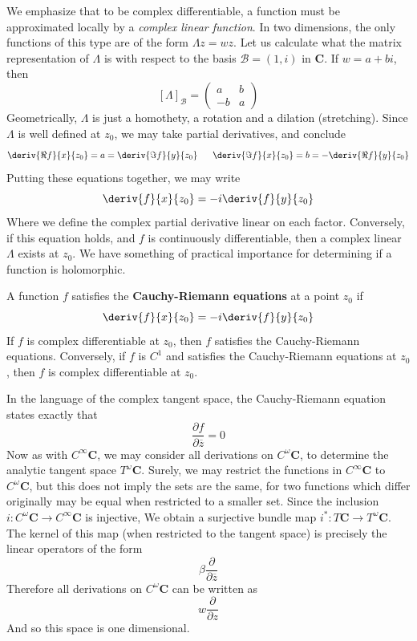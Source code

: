 We emphasize that to be complex differentiable, a function must be approximated locally by a {\it complex linear function}. In two dimensions, the only functions of this type are of the form $\Lambda z = wz$. Let us calculate what the matrix representation of $\Lambda$ is with respect to the basis $\mathcal{B} = (1, i)$ in $\mathbf{C}$. If $w = a + bi$, then
%
\[ [\Lambda]_{\mathcal{B}} = \begin{pmatrix} a & b \\ -b & a \end{pmatrix} \]
%
Geometrically, $\Lambda$ is just a homothety, a rotation and a dilation (stretching). Since $\Lambda$ is well defined at $z_0$, we may take partial derivatives, and conclude
%
\[ \deriv{\Re f}{x}{z_0} = a = \deriv{\Im f}{y}{z_0}\ \ \ \ \ \deriv{\Im f}{x}{z_0} = b = -\deriv{\Re f}{y}{z_0} \]
%
Putting these equations together, we may write
%
\[ \deriv{f}{x}{z_0} = -i \deriv{f}{y}{z_0} \]
%
Where we define the complex partial derivative linear on each factor. Conversely, if this equation holds, and $f$ is continuously differentiable, then a complex linear $\Lambda$ exists at $z_0$. We have something of practical importance for determining if a function is holomorphic.

\begin{theorem}
    A function $f$ satisfies the {\bf Cauchy-Riemann equations} at a point $z_0$ if
    \[ \deriv{f}{x}{z_0} = -i \deriv{f}{y}{z_0} \]
    If $f$ is complex differentiable at $z_0$, then $f$ satisfies the Cauchy-Riemann equations. Conversely, if $f$ is $C^1$ and satisfies the Cauchy-Riemann equations at $z_0$, then $f$ is complex differentiable at $z_0$.
\end{theorem}

In the language of the complex tangent space, the Cauchy-Riemann equation states exactly that
%
\[ \frac{\partial f}{\partial \overline{z}} = 0 \]
%
Now as with $C^\infty \mathbf{C}$, we may consider all derivations on $C^\omega \mathbf{C}$, to determine the analytic tangent space $T^\omega \mathbf{C}$. Surely, we may restrict the functions in $C^\infty \mathbf{C}$ to $C^\omega \mathbf{C}$, but this does not imply the sets are the same, for two functions which differ originally may be equal when restricted to a smaller set. Since the inclusion $i:C^\omega \mathbf{C} \to C^\infty \mathbf{C}$ is injective, We obtain a surjective bundle map $i^*: T \mathbf{C} \to T^\omega \mathbf{C}$. The kernel of this map (when restricted to the tangent space) is precisely the linear operators of the form
%
\[ \beta \frac{\partial}{\partial \overline{z}} \]
%
Therefore all derivations on $C^\omega \mathbf{C}$ can be written as
%
\[ w \frac{\partial}{\partial z} \]
%
And so this space is one dimensional.

